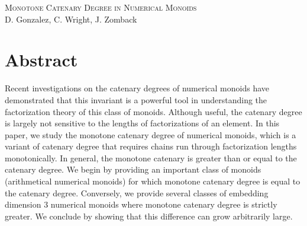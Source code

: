 \documentclass[10pt, oneside]{amsart}
\theoremstyle{remark}
\begin{document}
\begin{center}\textsc{\Large Monotone Catenary Degree in Numerical Monoids}\\
D. Gonzalez, C. Wright, J. Zomback

\end{center}

\section*{Abstract}

Recent investigations on the catenary degrees of numerical monoids have demonstrated that this invariant is a powerful tool in understanding the factorization theory of this class of monoids.  Although useful, the catenary degree is largely not sensitive to the lengths of factorizations of an element.  In this paper, we study the monotone catenary degree of numerical monoids, which is a variant of catenary degree that requires chains run through factorization lengths monotonically.  In general, the monotone catenary is greater than or equal to the catenary degree.  We begin by providing an important class of monoids (arithmetical numerical monoids) for which monotone catenary degree is equal to the catenary degree.  Conversely, we provide several classes of embedding dimension $3$ numerical monoids where monotone catenary degree is strictly greater.  We conclude by showing that this difference can grow arbitrarily large.
\end{document}
